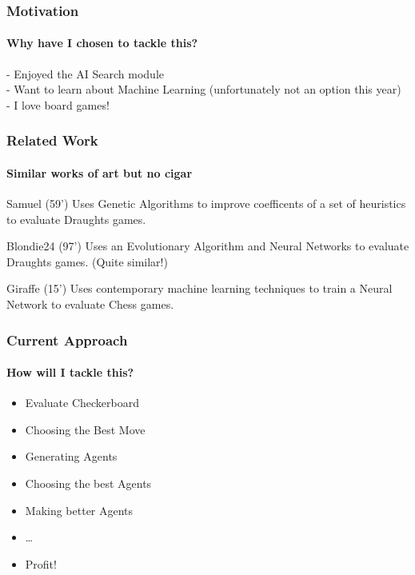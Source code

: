 \documentclass{beamer}
\begin{document}
\begin{frame}
	\frametitle{Motivation}
	\framesubtitle{Why have I chosen to tackle this?}

	- Enjoyed the AI Search module \\
	- Want to learn about Machine Learning (unfortunately not an option this year) \\
	- I love board games! \\

\end{frame}

\begin{frame}
	\frametitle{Related Work}
	\framesubtitle{Similar works of art but no cigar}
	\begin{block}{Samuel (59')}
		Uses Genetic Algorithms to improve coefficents of a set of heuristics to evaluate Draughts games.
	\end{block}
	\begin{block}{Blondie24 (97')}
		Uses an Evolutionary Algorithm and Neural Networks to evaluate Draughts games. (Quite similar!)
	\end{block}

	 \begin{block}{Giraffe (15')}
		Uses contemporary machine learning techniques to train a Neural Network to evaluate Chess games.
	 \end{block}
\end{frame}

\begin{frame}
	\frametitle{Current Approach}
	\framesubtitle{How will I tackle this?}
	\begin{itemize}
		\item Evaluate Checkerboard
		\item Choosing the Best Move
		\item Generating Agents
		\item Choosing the best Agents
		\item Making better Agents
		\item \ldots
		\item Profit!
	\end{itemize}

\end{frame}
\end{document}
